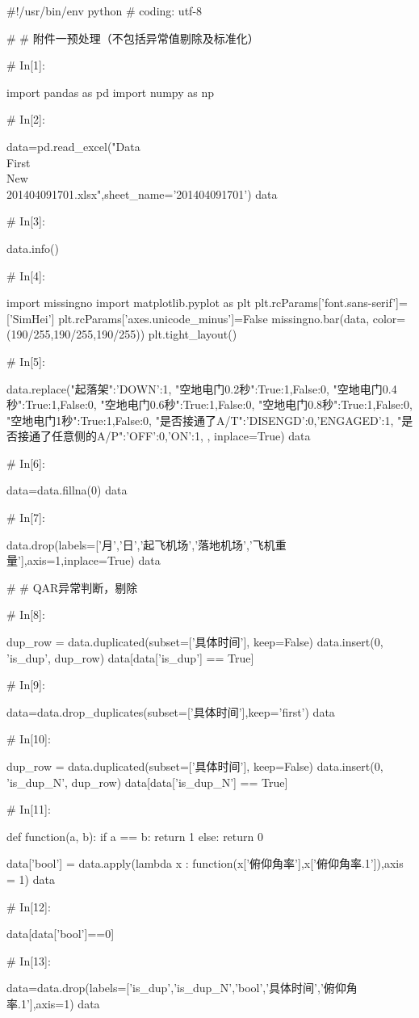 \documentclass{MathorCupModeling}
\begin{document}
\begin{python}
#!/usr/bin/env python
# coding: utf-8

# # 附件一预处理（不包括异常值剔除及标准化）

# In[1]:


import pandas as pd
import numpy as np


# In[2]:


data=pd.read_excel("Data\\First\\New\\201404091701.xlsx",sheet_name='201404091701')
data


# In[3]:


data.info()


# In[4]:


import missingno
import matplotlib.pyplot as plt
plt.rcParams['font.sans-serif']=['SimHei']
plt.rcParams['axes.unicode_minus']=False
missingno.bar(data, color=(190/255,190/255,190/255))
plt.tight_layout()


# In[5]:


data.replace({"起落架":{'DOWN':1},
              "空地电门0.2秒":{True:1,False:0},
              "空地电门0.4秒":{True:1,False:0},
              "空地电门0.6秒":{True:1,False:0},
              "空地电门0.8秒":{True:1,False:0},
              "空地电门1秒":{True:1,False:0},
              "是否接通了A/T":{'DISENGD':0,'ENGAGED':1},
              "是否接通了任意侧的A/P":{'OFF':0,'ON':1},
              }, inplace=True)
data


# In[6]:


data=data.fillna(0)
data


# In[7]:


data.drop(labels=['月','日','起飞机场','落地机场','飞机重量'],axis=1,inplace=True)
data


# # QAR异常判断，剔除

# In[8]:


dup_row = data.duplicated(subset=['具体时间'], keep=False)
data.insert(0, 'is_dup', dup_row)
data[data['is_dup'] == True]


# In[9]:


data=data.drop_duplicates(subset=['具体时间'],keep='first')
data


# In[10]:


dup_row = data.duplicated(subset=['具体时间'], keep=False)
data.insert(0, 'is_dup_N', dup_row)
data[data['is_dup_N'] == True]


# In[11]:


def function(a, b):
    if a == b:
        return 1
    else:
        return 0


data['bool'] = data.apply(lambda x : function(x['俯仰角率'],x['俯仰角率.1']),axis = 1)
data


# In[12]:


data[data['bool']==0]


# In[13]:


data=data.drop(labels=['is_dup','is_dup_N','bool','具体时间','俯仰角率.1'],axis=1)
data


\end{python}
\end{document}
